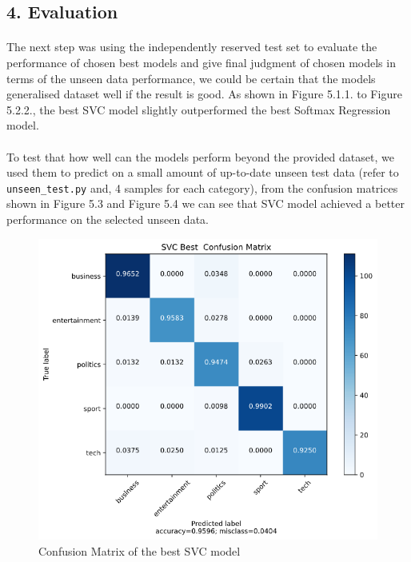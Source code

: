 \documentclass{article}
\begin{document}
 \subsection*{4. Evaluation}
 \paragraph{}
 The next step was using the independently reserved test set to evaluate the performance of chosen best models and give final judgment of chosen models in terms of the unseen data performance, we could be certain that the models generalised dataset well if the result is good. As shown in Figure 5.1.1. to Figure 5.2.2., the best SVC model slightly outperformed the best Softmax Regression model. 
 \paragraph{}
 To test that how well can the models perform beyond the provided dataset, we used them to predict on a small amount of up-to-date unseen test data (refer to \texttt{unseen_test.py} and, 4 samples for each category), from the confusion matrices shown in Figure 5.3 and Figure 5.4 we can see that SVC model achieved a better performance on the selected unseen data. 
  \renewcommand{\thefigure}{5.1.1.}
		\begin{figure}[H]
				\centerline{\includegraphics[scale=.4]{./SVC_CM.png}}
					\caption{Confusion Matrix of the best SVC model}
				\end{figure}
\end{document}
